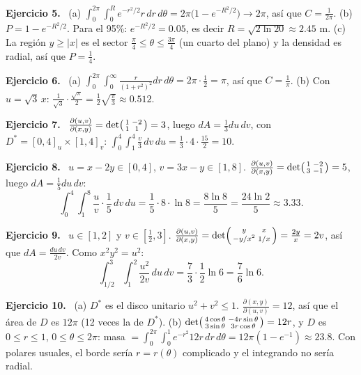 \documentclass[11pt,a4paper]{article}
\newcommand{\sol}[1]{\par\medskip\noindent\textbf{Ejercicio #1.}\ }
\begin{document}
\sol{5}
(a) $\int_0^{2\pi}\int_0^Re^{-r^2/2}r\,dr\,d\theta=2\pi\big(1-e^{-R^2/2}\big)\to2\pi$, así que $C=\frac1{2\pi}$.
(b) $P=1-e^{-R^2/2}$. Para el 95\%: $e^{-R^2/2}=0.05$, es decir $R=\sqrt{2\ln20}\approx2.45$ m.
(c) La región $y\ge|x|$ es el sector $\frac\pi4\le\theta\le\frac{3\pi}4$ (un cuarto del plano) y la densidad es radial, así que $P=\frac14$.

\sol{6}
(a) $\int_0^{2\pi}\int_0^\infty\frac{r}{(1+r^2)^2}dr\,d\theta=2\pi\cdot\frac12=\pi$, así que $C=\frac1\pi$.
(b) Con $u=\sqrt3\,x$: $\frac1{\sqrt3}\cdot\frac{\sqrt\pi}2=\frac12\sqrt{\frac\pi3}\approx0.512$.

\sol{7}
$\frac{\partial(u,v)}{\partial(x,y)}=\det\begin{psmallmatrix}1&-2\\1&1\end{psmallmatrix}=3$, luego $dA=\frac13du\,dv$, con $D^*=[0,4]_u\times[1,4]_v$:
$\int_0^4\int_1^4\frac v3\,dv\,du=\frac13\cdot4\cdot\frac{15}2=10$.

\sol{8}
$u=x-2y\in[0,4]$, $v=3x-y\in[1,8]$. $\frac{\partial(u,v)}{\partial(x,y)}=\det\begin{psmallmatrix}1&-2\\3&-1\end{psmallmatrix}=5$, luego $dA=\frac15du\,dv$:
\[
\int_0^4\!\!\int_1^8\frac uv\cdot\frac15\,dv\,du=\frac15\cdot8\cdot\ln8=\frac{8\ln8}5=\frac{24\ln2}5\approx3.33 .
\]

\sol{9}
$u\in[1,2]$ y $v\in[\frac12,3]$. $\frac{\partial(u,v)}{\partial(x,y)}=\det\begin{psmallmatrix}y&x\\-y/x^2&1/x\end{psmallmatrix}=\frac{2y}x=2v$, así que $dA=\frac{du\,dv}{2v}$. Como $x^2y^2=u^2$:
\[
\int_{1/2}^3\!\!\int_1^2\frac{u^2}{2v}\,du\,dv=\frac73\cdot\frac12\ln6=\frac76\ln6 .
\]

\sol{10}
(a) $D^*$ es el disco unitario $u^2+v^2\le1$. $\frac{\partial(x,y)}{\partial(u,v)}=12$, así que el área de $D$ es $12\pi$ (12 veces la de $D^*$).
(b) $\det\begin{psmallmatrix}4\cos\theta&-4r\sin\theta\\3\sin\theta&3r\cos\theta\end{psmallmatrix}=12r$, y $D$ es $0\le r\le1$, $0\le\theta\le2\pi$:
masa $=\int_0^{2\pi}\int_0^1e^{-r^2}12r\,dr\,d\theta=12\pi(1-e^{-1})\approx23.8$. Con polares usuales, el borde sería $r=r(\theta)$ complicado y el integrando no sería radial.
\end{document}

